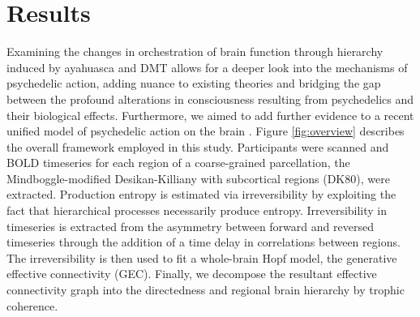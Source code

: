 \chapter{Results}
Examining the changes in orchestration of brain function through hierarchy induced by ayahuasca and DMT
allows for a deeper look into the mechanisms of psychedelic action, adding nuance to existing theories and bridging 
the gap between the profound alterations in consciousness resulting from psychedelics and their biological effects. Furthermore, we aimed to add further evidence to a recent unified model of psychedelic action on the brain \parencite{Carhart-Harris2019a}.
Figure \ref{fig:overview} describes the overall framework employed in this study. Participants were scanned and BOLD timeseries for each region of a coarse-grained parcellation, the Mindboggle-modified Desikan-Killiany with subcortical regions (DK80), were extracted. Production entropy is estimated via irreversibility by exploiting the fact that hierarchical processes necessarily produce entropy. Irreversibility in timeseries is extracted from the asymmetry between forward and reversed timeseries through the addition of a time delay in correlations between regions. The irreversibility is then used to fit a whole-brain Hopf model, the generative effective connectivity (GEC). Finally, we decompose the resultant effective connectivity graph into the directedness and regional brain hierarchy by trophic coherence.

